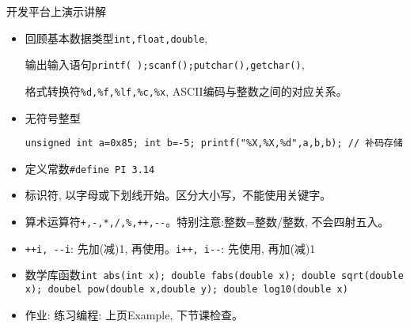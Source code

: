 \begin{frame}{开发平台上演示讲解}
\vspace{-0.5cm}
\begin{itemize}
	\item 回顾基本数据类型\lstinline|int,float,double|,
	
	 输出输入语句\lstinline|printf( );scanf();putchar(),getchar()|,
	 
	 格式转换符\lstinline|%d,%f,%lf,%c,%x|, ASCII编码与整数之间的对应关系。
	\item 无符号整型
	
	\lstinline|unsigned int a=0x85; int b=-5; printf("%X,%X,%d",a,b,b); // 补码存储| 
	\item 定义常数\lstinline|#define PI 3.14|
	\item 标识符, 以字母或下划线开始。区分大小写，不能使用关键字。
	\item 算术运算符\lstinline|+,-,*,/,%,++,--|。特别注意:整数=整数/整数, 不会四射五入。
	\item \lstinline|++i, --i|: 先加(减)1, 再使用。\lstinline|i++, i--|: 先使用, 再加(减)1
	\item 数学库函数\lstinline|int abs(int x); double fabs(double x); double sqrt(double x); doubel pow(double x,double y); double log10(double x)|
	\item 作业: 练习编程: 上页Example, 下节课检查。
\end{itemize}
\end{frame}




